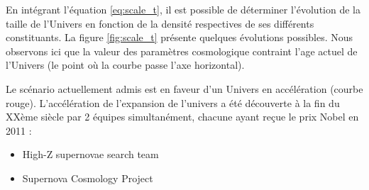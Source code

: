 En intégrant l’équation \ref{eq:scale_t}, il est possible de déterminer l'évolution de la taille de l'Univers en fonction de la densité respectives de ses différents constituants.
La figure \ref{fig:scale_t} présente quelques évolutions possibles.
Nous observons ici que la valeur des paramètres cosmologique contraint l'age actuel de l'Univers (le point où la courbe passe l'axe horizontal).

Le scénario actuellement admis est en faveur d'un Univers en accélération (courbe rouge).
L'accélération de l'expansion de l'univers a été découverte à la fin du XXème siècle par 2 équipes simultanément, chacune ayant reçue le prix Nobel en 2011 :
\begin{itemize}
\item  High-Z supernovae search team \citep{1998AJ....116.1009R} %
\item  Supernova Cosmology Project \citep{1999ApJ...517..565P} %
\end{itemize}

